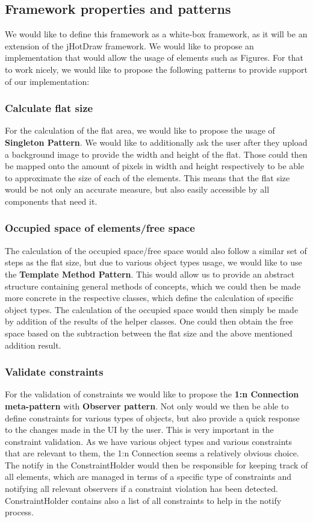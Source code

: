 \subsection{Framework properties and patterns}
We would like to define this framework as a white-box framework, as it will be an extension of the jHotDraw framework. We would like to propose an implementation that would allow the usage of elements such as Figures. For that to work nicely, we would like to propose the following patterns to provide support of our implementation:

\subsubsection{Calculate flat size}
For the calculation of the flat area, we would like to propose the usage of \textbf{Singleton Pattern}. We would like to additionally ask the user after they upload a background image to provide the width and height of the flat. Those could then be mapped onto the amount of pixels in width and height respectively to be able to approximate the size of each of the elements. This means that the flat size would be not only an accurate measure, but also easily accessible by all components that need it.

\subsubsection{Occupied space of elements/free space}
The calculation of the occupied space/free space would also follow a similar set of steps as the flat size, but due to various object types usage, we would like to use the \textbf{Template Method Pattern}. This would allow us to provide an abstract structure containing general methods of concepts, which we could then be made more concrete in the respective classes, which define the calculation of specific object types. The calculation of the occupied space would then simply be made by addition of the results of the helper classes. One could then obtain the free space based on the subtraction between the flat size and the above mentioned addition result.

\subsubsection{Validate constraints}
For the validation of constraints we would like to propose the \textbf{1:n Connection meta-pattern} with \textbf{Observer pattern}. Not only would we then be able to define constraints for various types of objects, but also provide a quick response to the changes made in the UI by the user. This is very important in the constraint validation. As we have various object types and various constraints that are relevant to them, the 1:n Connection seems a relatively obvious choice.
The notify in the ConstraintHolder would then be responsible for keeping track of all elements, which are managed in terms of a specific type of constraints and notifying all relevant observers if a constraint violation has been detected. ConstraintHolder contains also a list of all constraints to help in the notify process.

